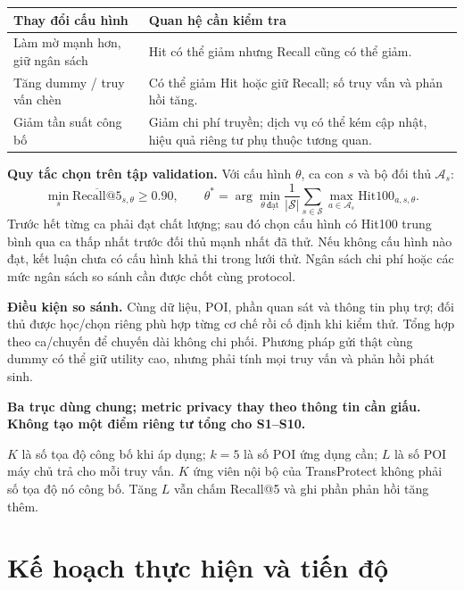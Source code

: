 \documentclass[10pt,a4paper]{article}
\newcommand{\key}[1]{\par\smallskip\noindent\colorbox{pale}{\parbox{\dimexpr\linewidth-2\fboxsep}{\textbf{#1}}}\par\smallskip}
\begin{document}
\begin{tabularx}{\linewidth}{@{}P{4.0cm}Y@{}}
\toprule\textbf{Thay đổi cấu hình}&\textbf{Quan hệ cần kiểm tra}\\\midrule
Làm mờ mạnh hơn, giữ ngân sách & Hit có thể giảm nhưng Recall cũng có thể giảm.\\
Tăng dummy / truy vấn chèn & Có thể giảm Hit hoặc giữ Recall; số truy vấn và phản hồi tăng.\\
Giảm tần suất công bố & Giảm chi phí truyền; dịch vụ có thể kém cập nhật, hiệu quả riêng tư phụ thuộc tương quan.\\\bottomrule
\end{tabularx}

\textbf{Quy tắc chọn trên tập validation.} Với cấu hình $\theta$, ca con $s$ và bộ đối thủ $\mathcal A_s$:
\[
\min_s\overline{\mathrm{Recall@5}}_{s,\theta}\ge0.90,
\qquad
\theta^*=\arg\min_{\theta\ \mathrm{đạt}}\frac1{|\mathcal S|}\sum_{s\in\mathcal S}
\max_{a\in\mathcal A_s}\mathrm{Hit100}_{a,s,\theta}.
\]
Trước hết từng ca phải đạt chất lượng; sau đó chọn cấu hình có Hit100 trung bình qua ca thấp nhất trước đối thủ mạnh nhất đã thử. Nếu không cấu hình nào đạt, kết luận chưa có cấu hình khả thi trong lưới thử. Ngân sách chi phí hoặc các mức ngân sách so sánh cần được chốt cùng protocol.

\textbf{Điều kiện so sánh.} Cùng dữ liệu, POI, phần quan sát và thông tin phụ trợ; đối thủ được học/chọn riêng phù hợp từng cơ chế rồi cố định khi kiểm thử. Tổng hợp theo ca/chuyến để chuyến dài không chi phối. Phương pháp gửi thật cùng dummy có thể giữ utility cao, nhưng phải tính mọi truy vấn và phản hồi phát sinh.

\key{Ba trục dùng chung; metric privacy thay theo thông tin cần giấu. Không tạo một điểm riêng tư tổng cho S1--S10.}
$K$ là số tọa độ công bố khi áp dụng; $k=5$ là số POI ứng dụng cần; $L$ là số POI máy chủ trả cho mỗi truy vấn. $K$ ứng viên nội bộ của TransProtect không phải số tọa độ nó công bố. Tăng $L$ vẫn chấm Recall@5 và ghi phần phản hồi tăng thêm.

\newpage
\section{Kế hoạch thực hiện và tiến độ}
\end{document}
